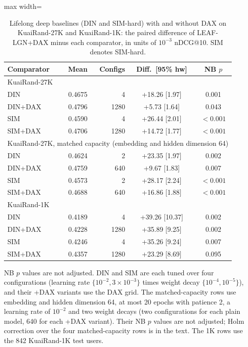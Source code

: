 \begin{table}[tbp]
\centering
\footnotesize
\caption{Lifelong deep baselines (DIN and SIM-hard) with and without DAX on KuaiRand-27K and KuaiRand-1K: the paired difference of LEAF-LGN+DAX minus each comparator, in units of $10^{-3}$ nDCG@10. SIM denotes SIM-hard.}
\label{tab:deep}
\begin{adjustbox}{max width=\linewidth}
\begin{tabular}{lrrcc}
\toprule
Comparator & Mean & Configs & Diff.\ [95\% hw] & NB $p$ \\
\midrule
\multicolumn{5}{l}{KuaiRand-27K} \\
DIN & 0.4675 & 4 & +18.26 [1.97] & 0.001 \\
DIN+DAX & 0.4796 & 1280 & +5.73 [1.64] & 0.043 \\
SIM & 0.4590 & 4 & +26.44 [2.01] & $<0.001$ \\
SIM+DAX & 0.4706 & 1280 & +14.72 [1.77] & $<0.001$ \\
\midrule
\multicolumn{5}{l}{KuaiRand-27K, matched capacity (embedding and hidden dimension 64)} \\
DIN & 0.4624 & 2 & +23.35 [1.97] & 0.002 \\
DIN+DAX & 0.4759 & 640 & +9.67 [1.83] & 0.007 \\
SIM & 0.4573 & 2 & +28.17 [2.24] & $<0.001$ \\
SIM+DAX & 0.4688 & 640 & +16.86 [1.88] & $<0.001$ \\
\midrule
\multicolumn{5}{l}{KuaiRand-1K} \\
DIN & 0.4189 & 4 & +39.26 [10.37] & 0.002 \\
DIN+DAX & 0.4228 & 1280 & +35.89 [9.25] & 0.002 \\
SIM & 0.4246 & 4 & +35.26 [9.24] & 0.007 \\
SIM+DAX & 0.4357 & 1280 & +23.29 [8.69] & 0.095 \\
\midrule
\bottomrule
\end{tabular}
\end{adjustbox}
\par\smallskip
\begin{minipage}{\linewidth}\raggedright\footnotesize NB $p$ values are not adjusted. DIN and SIM are each tuned over four configurations (learning rate $\{10^{-2},3\times10^{-3}\}$ times weight decay $\{10^{-4},10^{-5}\}$), and their +DAX variants use the DAX grid. The matched-capacity rows use embedding and hidden dimension 64, at most 20 epochs with patience 2, a learning rate of $10^{-2}$ and two weight decays (two configurations for each plain model, 640 for each +DAX variant). Their NB $p$ values are not adjusted; Holm correction over the four matched-capacity rows is in the text. The 1K rows use the 842 KuaiRand-1K test users.\end{minipage}
\end{table}
